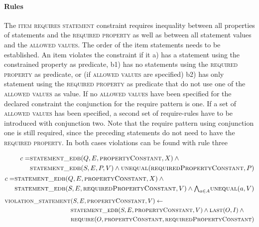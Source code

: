 \documentclass[hyperref,bachelorofscience,fleqn]{cgvpub}
\begin{document}
\paragraph{Rules}
The \textsc{item requires statement} constraint requires inequality between all properties of statements and the \textsc{required property} as well as between all statement values and the \textsc{allowed values}. The order of the item statements needs to be established. An item violates the constraint if it a) has a statement using the constrained property as predicate, b1) has no statements using the \textsc{required property} as predicate, or (if \textsc{allowed values} are specified) b2) has only statement using the \textsc{required property} as predicate that do not use one of the \textsc{allowed values} as value. If no \textsc{allowed values} have been specified for the declared constraint the conjunction for the require pattern is one. If a set of \textsc{allowed values} has been specified, a second set of require-rules have to be introduced with conjunction two. Note that the require pattern using conjunction one is still required, since the preceding statements do not need to have the \textsc{required property}. In both cases violations can be found with rule three

\begin{align}
\begin{split}
c = &\textsc{statement\_edb}(Q, E, \textsc{propertyConstant}, X) \wedge{} \\
&\textsc{statement\_edb}(S, E, P, V) \wedge \textsc{unequal}(\textsc{requiredPropertyConstant}, P)
\end{split} \\
\begin{split}
c = &\textsc{statement\_edb}(Q, E, \textsc{propertyConstant}, X) \wedge{} \\
&\textsc{statement\_edb}(S, E, \textsc{requiredPropertyConstant}, V) \wedge {\textstyle\bigwedge}_{a \in A} \textsc{unequal}(a, V)
\end{split}
\end{align}
\begin{align}
\begin{split}
\textsc{violation\_statement}&(S, E, \textsc{propertyConstant}, V) \leftarrow \\
&\textsc{statement\_edb}(S, E, \textsc{propertyConstant}, V) \wedge{} \textsc{last}(O, I) \wedge{} \\
&\textsc{require}(O, \textsc{propertyConstant}, \textsc{requiredPropertyConstant})
\end{split}
\end{align}
\end{document}
